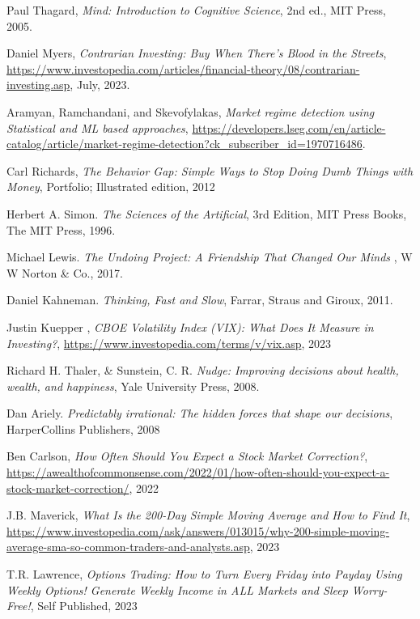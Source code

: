 \documentclass[conference]{IEEEtran}
\begin{document}
\begin{thebibliography}{00}

     Paul Thagard, \emph{Mind: Introduction to Cognitive Science}, 2nd ed., MIT Press, 2005.

     Daniel Myers, \emph{Contrarian Investing: Buy When There's Blood in the Streets}, \url{https://www.investopedia.com/articles/financial-theory/08/contrarian-investing.asp}, July, 2023.

     Aramyan, Ramchandani, and Skevofylakas, \emph{Market regime detection using Statistical and ML based approaches}, \url{https://developers.lseg.com/en/article-catalog/article/market-regime-detection?ck_subscriber_id=1970716486}.

     Carl Richards, \emph{The Behavior Gap: Simple Ways to Stop Doing Dumb Things with Money}, Portfolio; Illustrated edition, 2012

     Herbert A. Simon. \emph{The Sciences of the Artificial}, 3rd Edition, MIT Press Books, The MIT Press, 1996.

     Michael Lewis. \emph{The Undoing Project: A Friendship That Changed Our Minds} , W W Norton \& Co., 2017.

     Daniel Kahneman. \emph{Thinking, Fast and Slow}, Farrar, Straus and Giroux, 2011.

     Justin Kuepper , \emph{CBOE Volatility Index (VIX): What Does It Measure in Investing?}, \url{https://www.investopedia.com/terms/v/vix.asp}, 2023

     Richard H. Thaler, \& Sunstein, C. R.  \emph{Nudge: Improving decisions about health, wealth, and happiness}, Yale University Press, 2008.

     Dan Ariely. \emph{Predictably irrational: The hidden forces that shape our decisions}, HarperCollins Publishers, 2008

     Ben Carlson, \emph{How Often Should You Expect a Stock Market Correction?}, \url{https://awealthofcommonsense.com/2022/01/how-often-should-you-expect-a-stock-market-correction/}, 2022

     J.B. Maverick, \emph{What Is the 200-Day Simple Moving Average and How to Find It}, \url{https://www.investopedia.com/ask/answers/013015/why-200-simple-moving-average-sma-so-common-traders-and-analysts.asp}, 2023

     T.R. Lawrence, \emph{Options Trading: How to Turn Every Friday into Payday Using Weekly Options! Generate Weekly Income in ALL Markets and Sleep Worry-Free!}, Self Published, 2023
\end{thebibliography}
\end{document}
